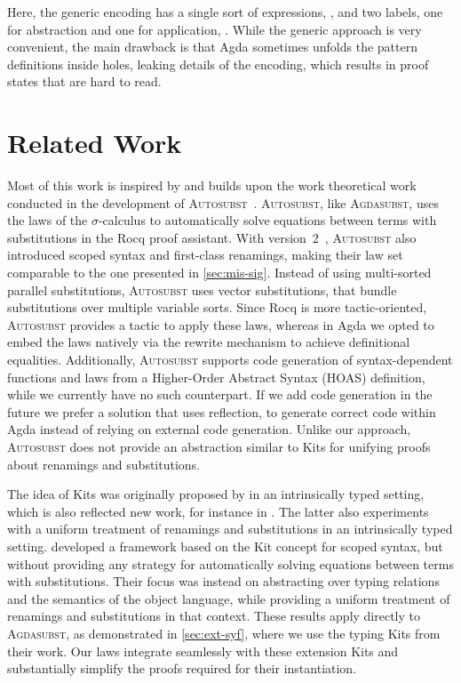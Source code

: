 \documentclass[screen,nonacm]{acmart}
\begin{document}
Here, the generic encoding has a single sort of expressions, \GSort{}, and two
labels, one for abstraction and one for application, \GLabel{}. While the
generic approach is very convenient, the main drawback is that Agda sometimes
unfolds the pattern definitions inside holes, leaking details of the encoding,
which results in proof states that are hard to read.

\section{Related Work}\label{sec:rel}
Most of this work is inspired by and builds upon the work theoretical work
conducted in the development of \textsc{Autosubst}~\cite{schafer2015autosubst}.
\textsc{Autosubst}, like \textsc{Agdasubst}, uses the laws of the
$\sigma$-calculus to automatically solve equations between terms with
substitutions in the Rocq proof assistant. With
version~2~\cite{10.1145/3293880.3294101}, \textsc{Autosubst} also introduced
scoped syntax and first-class renamings, making their law set comparable to the
one presented in \cref{sec:mis-sig}. Instead of using multi-sorted parallel
substitutions, \textsc{Autosubst} uses vector substitutions, that bundle
substitutions over multiple variable sorts. Since Rocq is more tactic-oriented,
\textsc{Autosubst} provides a tactic to apply these laws, whereas in Agda we
opted to embed the laws natively via the rewrite mechanism to achieve
definitional equalities. Additionally, \textsc{Autosubst} supports code
generation of syntax-dependent functions and laws from a Higher-Order Abstract
Syntax (HOAS) definition, while we currently have no such counterpart. If we
add code generation in the future we prefer a solution that uses reflection, to
generate correct code within Agda instead of relying on external code
generation. Unlike our approach, \textsc{Autosubst} does not provide an
abstraction similar to Kits for unifying proofs about renamings and
substitutions.

The idea of Kits was originally proposed by \citeauthor{ren-sub} in an
intrinsically typed setting, which is also reflected new work, for instance in
\cite{altenkirch2025substitution}. The latter also experiments with a uniform
treatment of renamings and substitutions in an intrinsically typed setting.
\citet{saffrich:LIPIcs.ITP.2024.32} developed a framework based on the Kit
concept for scoped syntax, but without providing any strategy for automatically
solving equations between terms with substitutions. Their focus was instead on
abstracting over typing relations and the semantics of the object language,
while providing a uniform treatment of renamings and substitutions in that
context. These results apply directly to \textsc{Agdasubst}, as demonstrated in
\cref{sec:ext-syf}, where we use the typing Kits from their work. Our laws
integrate seamlessly with these extension Kits and substantially simplify the
proofs required for their instantiation.
\end{document}
